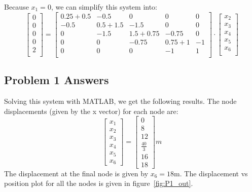 \documentclass[8pt]{article}
\begin{document}
Because \(x_1 = 0\), we can simplify this system into:
\[
\begin{bmatrix} 
    0 \\
    0 \\
    0 \\
    0 \\
    2 \\
\end{bmatrix}
=
\begin{bmatrix}
    0.25 + 0.5 & -0.5 & 0 & 0 & 0 \\
    -0.5 & 0.5 + 1.5 & -1.5 & 0 & 0 \\
    0 & -1.5 & 1.5 + 0.75 & -0.75 & 0 \\
    0 & 0 & -0.75 & 0.75 + 1 & -1 \\
    0 & 0 & 0 & -1 & 1 \\
\end{bmatrix}
\cdot
\begin{bmatrix}
    x_2 \\
    x_3 \\
    x_4 \\
    x_5 \\
    x_6 \\
\end{bmatrix}
\]

\subsection{Problem 1 Answers}
Solving this system with MATLAB, we get the following results. The node displacements (given by the x vector) for each node are:
\[
\begin{bmatrix}
    x_1 \\
    x_2 \\
    x_3 \\
    x_4 \\
    x_5 \\
    x_6 
\end{bmatrix}
=
\begin{bmatrix}
    0 \\
    8 \\
    12 \\
    \frac{40}{3} \\
    16 \\
    18 
\end{bmatrix}
m
\]
The displacement at the final node is given by \(x_6 = 18\)m.
The displacement vs position plot for all the nodes is given in figure~\ref{fig:P1_out}.
\end{document}

